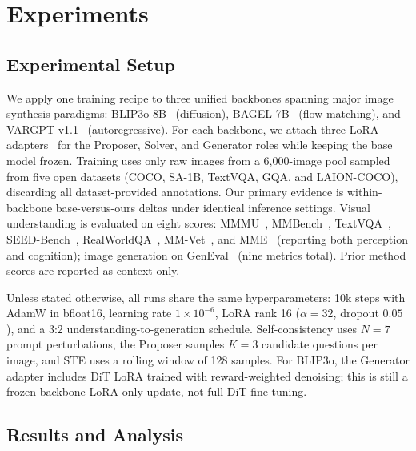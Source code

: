 
\section{Experiments}
\label{sec:experiments}

\subsection{Experimental Setup}
\label{sec:setup}

We apply one training recipe to three unified backbones spanning major image synthesis paradigms: BLIP3o-8B~\cite{chen2025blip3o} (diffusion), BAGEL-7B~\cite{deng2025bagel} (flow matching), and VARGPT-v1.1~\cite{zhuang2025vargpt} (autoregressive). For each backbone, we attach three LoRA adapters~\cite{hu2022lora} for the Proposer, Solver, and Generator roles while keeping the base model frozen. Training uses only raw images from a 6{,}000-image pool sampled from five open datasets (COCO, SA-1B, TextVQA, GQA, and LAION-COCO), discarding all dataset-provided annotations. Our primary evidence is within-backbone base-versus-ours deltas under identical inference settings. Visual understanding is evaluated on eight scores: MMMU~\cite{yue2024mmmu}, MMBench~\cite{liu2024mmbench}, TextVQA~\cite{singh2019textvqa}, SEED-Bench~\cite{li2024seedbench}, RealWorldQA~\cite{lmmseval2024}, MM-Vet~\cite{yu2023mmvet}, and MME~\cite{fu2024mme} (reporting both perception and cognition); image generation on GenEval~\cite{ghosh2024geneval} (nine metrics total). Prior method scores are reported as context only.

Unless stated otherwise, all runs share the same hyperparameters: 10k steps with AdamW in bfloat16, learning rate $1\times10^{-6}$, LoRA rank 16 ($\alpha{=}32$, dropout $0.05$), and a 3:2 understanding-to-generation schedule. Self-consistency uses $N{=}7$ prompt perturbations, the Proposer samples $K{=}3$ candidate questions per image, and STE uses a rolling window of 128 samples. For BLIP3o, the Generator adapter includes DiT LoRA trained with reward-weighted denoising; this is still a frozen-backbone LoRA-only update, not full DiT fine-tuning.

\subsection{Results and Analysis}
\label{sec:main_results}




